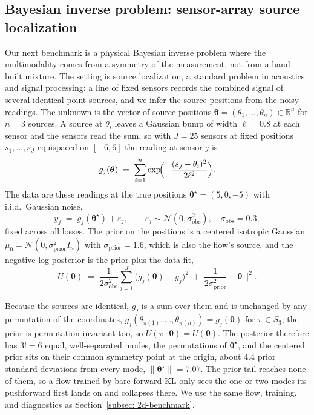 \documentclass{article}
\begin{document}
\subsection{Bayesian inverse problem: sensor-array source localization}
\label{subsec: sensor}

Our next benchmark is a physical Bayesian inverse problem where the multimodality comes from a symmetry of the measurement, not from a hand-built mixture. The setting is source localization, a standard problem in acoustics and signal processing: a line of fixed sensors records the combined signal of several identical point sources, and we infer the source positions from the noisy readings. The unknown is the vector of source positions $\boldsymbol{\theta} = (\theta_1, \dots, \theta_n) \in \mathbb R^n$ for $n = 3$ sources. A source at $\theta_i$ leaves a Gaussian bump of width $\ell = 0.8$ at each sensor and the sensors read the sum, so with $J = 25$ sensors at fixed positions $s_1, \dots, s_J$ equispaced on $[-6, 6]$ the reading at sensor $j$ is
\begin{equation*}
    g_j(\boldsymbol{\theta}) \;=\; \sum_{i=1}^{n} \exp\!\Bigl( -\frac{(s_j - \theta_i)^2}{2\ell^2} \Bigr).
\end{equation*}
The data are these readings at the true positions $\boldsymbol{\theta}^\star = (5, 0, -5)$ with i.i.d.\ Gaussian noise,
\begin{equation*}
    y_j \;=\; g_j(\boldsymbol{\theta}^\star) + \varepsilon_j, \qquad \varepsilon_j \sim \mathcal N(0, \sigma_{\mathrm{obs}}^2), \quad \sigma_{\mathrm{obs}} = 0.3,
\end{equation*}
fixed across all losses. The prior on the positions is a centered isotropic Gaussian $\mu_0 = \mathcal N(0, \sigma_{\mathrm{prior}}^2 I_n)$ with $\sigma_{\mathrm{prior}} = 1.6$, which is also the flow's source, and the negative log-posterior is the prior plus the data fit,
\begin{equation}
    U(\boldsymbol{\theta}) \;=\; \frac{1}{2\sigma_{\mathrm{obs}}^2} \sum_{j=1}^{J} \bigl( g_j(\boldsymbol{\theta}) - y_j \bigr)^2 \;+\; \frac{1}{2\sigma_{\mathrm{prior}}^2}\,\|\boldsymbol{\theta}\|^2 .
    \label{eq: sensor-potential}
\end{equation}

Because the sources are identical, $g_j$ is a sum over them and is unchanged by any permutation of the coordinates, $g_j(\theta_{\pi(1)}, \dots, \theta_{\pi(n)}) = g_j(\boldsymbol{\theta})$ for $\pi \in S_3$; the prior is permutation-invariant too, so $U(\pi\cdot\boldsymbol{\theta}) = U(\boldsymbol{\theta})$. The posterior therefore has $3! = 6$ equal, well-separated modes, the permutations of $\boldsymbol{\theta}^\star$, and the centered prior sits on their common symmetry point at the origin, about $4.4$ prior standard deviations from every mode, $\|\boldsymbol{\theta}^\star\| = 7.07$. The prior tail reaches none of them, so a flow trained by bare forward KL only sees the one or two modes its pushforward first lands on and collapses there. We use the same flow, training, and diagnostics as Section~\ref{subsec: 2d-benchmark}.
\end{document}
